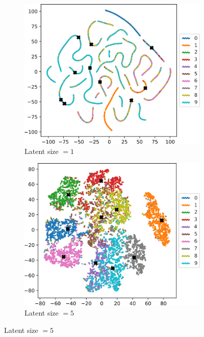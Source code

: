 \begin{figure}[]
     \centering
     \begin{subfigure}[b]{0.47\textwidth}
         \centering
         \includegraphics[width=\textwidth]{observational/img/vae/vae_TSNE_ls1.png}
         \caption{Latent size $=1$}
     \end{subfigure}
     \hfill
     \begin{subfigure}[b]{0.47\textwidth}
         \centering
         \includegraphics[width=\textwidth]{observational/img/vae/vae_TSNE_ls5.png}
         \caption{Latent size $=5$}
     \end{subfigure} 

\end{figure}
